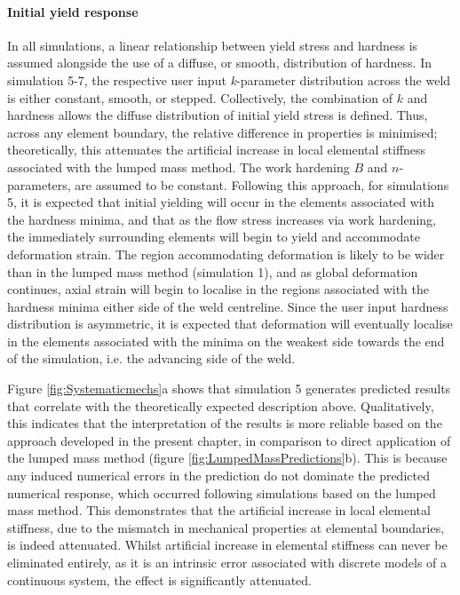\paragraph{Initial yield response}
\label{SMDModellingstudyDiscussionPropertydistributionsYS}
In all simulations, a linear relationship between yield stress and hardness is assumed alongside the use of a diffuse, or smooth, distribution of hardness. In simulation 5-7, the respective user input \textit{k}-parameter distribution across the weld is either constant, smooth, or stepped. Collectively, the combination of $k$ and hardness allows the diffuse distribution of initial yield stress is defined. Thus, across any element boundary, the relative difference in properties is minimised; theoretically, this attenuates the artificial increase in local elemental stiffness associated with the lumped mass method. The work hardening $B$ and $n$-parameters, are assumed to be constant. Following this approach, for simulations 5, it is expected that initial yielding will occur in the elements associated with the hardness minima, and that as the flow stress increases via work hardening, the immediately surrounding elements will begin to yield and accommodate deformation strain. The region accommodating deformation is likely to be wider than in the lumped mass method (simulation 1), and as global deformation continues, axial strain will begin to localise in the regions associated with the hardness minima either side of the weld centreline. Since the user input hardness distribution is asymmetric, it is expected that deformation will eventually localise in the elements associated with the minima on the weakest side towards the end of the simulation, i.e. the advancing side of the weld. 

Figure \ref{fig:Systematicmechs}a shows that simulation 5 generates predicted results that correlate with the theoretically expected description above. Qualitatively, this indicates that the interpretation of the results is more reliable based on the approach developed in the present chapter, in comparison to direct application of the lumped mass method (figure \ref{fig:LumpedMassPredictions}b). This is because any induced numerical errors in the prediction do not dominate the predicted numerical response, which occurred following simulations based on the lumped mass method. This demonstrates that the artificial increase in local elemental stiffness, due to the mismatch in mechanical properties at elemental boundaries, is indeed attenuated. Whilst artificial increase in elemental stiffness can never be eliminated entirely, as it is an intrinsic error associated with discrete models of a continuous system, the effect is significantly attenuated. 

